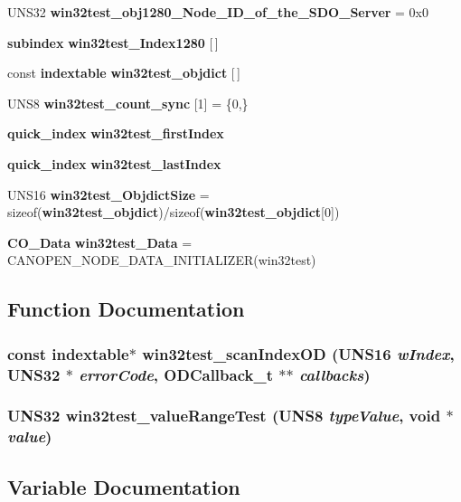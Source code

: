 \begin{CompactItemize}
\item 
UNS32 {\bf win32test\_\-obj1280\_\-Node\_\-ID\_\-of\_\-the\_\-SDO\_\-Server} = 0x0
\item 
{\bf subindex} {\bf win32test\_\-Index1280} [$\,$]
\item 
const {\bf indextable} {\bf win32test\_\-objdict} [$\,$]
\item 
UNS8 {\bf win32test\_\-count\_\-sync} [1] = \{0,\}
\item 
{\bf quick\_\-index} {\bf win32test\_\-first\-Index}
\item 
{\bf quick\_\-index} {\bf win32test\_\-last\-Index}
\item 
UNS16 {\bf win32test\_\-Objdict\-Size} = sizeof({\bf win32test\_\-objdict})/sizeof({\bf win32test\_\-objdict}[0])
\item 
{\bf CO\_\-Data} {\bf win32test\_\-Data} = CANOPEN\_\-NODE\_\-DATA\_\-INITIALIZER(win32test)
\end{CompactItemize}


\subsection{Function Documentation}
\subsubsection{\setlength{\rightskip}{0pt plus 5cm}const {\bf indextable}$\ast$ win32test\_\-scan\-Index\-OD (UNS16 {\em w\-Index}, UNS32 $\ast$ {\em error\-Code}, {\bf ODCallback\_\-t} $\ast$$\ast$ {\em callbacks})}\label{win32test_8c_f87ee1a746c3da5f7e47ff820868ad1c}


\subsubsection{\setlength{\rightskip}{0pt plus 5cm}UNS32 win32test\_\-value\-Range\-Test (UNS8 {\em type\-Value}, void $\ast$ {\em value})}\label{win32test_8c_ddda9facea7c64aed8be251225187171}




\subsection{Variable Documentation}
